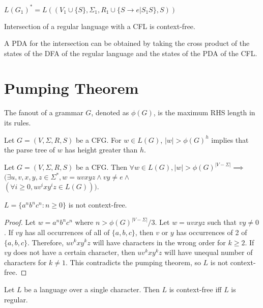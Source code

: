 $L(G_1)^* = L((V_1 \cup \{S\}, \Sigma_1,
R_1 \cup \{S \rightarrow e | S_1S \}, S))$

\begin{theorem}
Intersection of a regular language with a CFL is context-free.
\end{theorem}
A PDA for the intersection can be obtained by taking the
cross product of the states of the DFA of the regular language
and the states of the PDA of the CFL.

\section{Pumping Theorem}

\begin{definition}
The fanout of a grammar $G$, denoted as $\phi(G)$, is the maximum RHS length in its rules.
\end{definition}
\begin{lemma}
Let $G = (V, \Sigma, R, S)$ be a CFG.
For $w \in L(G)$, $|w| > \phi(G)^h$ implies that the parse tree of $w$ has height greater than $h$.
\end{lemma}
\begin{theorem}
Let $G = (V, \Sigma, R, S)$ be a CFG.
Then $\forall w \in L(G), |w| > \phi(G)^{|V - \Sigma|} \implies$\\
$(\exists u, v, x, y, z \in \Sigma^*, w = uvxyz \wedge vy \neq e \wedge$\\
$(\forall i \ge 0, uv^ixy^iz \in L(G)))$.
\end{theorem}

\begin{corollary}
$L = \{a^nb^nc^n: n \ge 0\}$ is not context-free.
\end{corollary}
\begin{proof}
Let $w = a^nb^nc^n$ where $n > \phi(G)^{|V-\Sigma|}/3$.
Let $w = uvxyz$ such that $vy \neq 0$.
If $vy$ has all occurrences of all of $\{a, b, c\}$,
then $v$ or $y$ has occurrences of 2 of $\{a, b, c\}$.
Therefore, $uv^kxy^kz$ will have characters in the wrong order for $k \ge 2$.
If $vy$ does not have a certain character,
then $uv^kxy^kz$ will have unequal number of characters for $k \neq 1$.
This contradicts the pumping theorem, so $L$ is not context-free.
\end{proof}

\begin{theorem}
Let $L$ be a language over a single character.
Then $L$ is context-free iff $L$ is regular.
\end{theorem}

